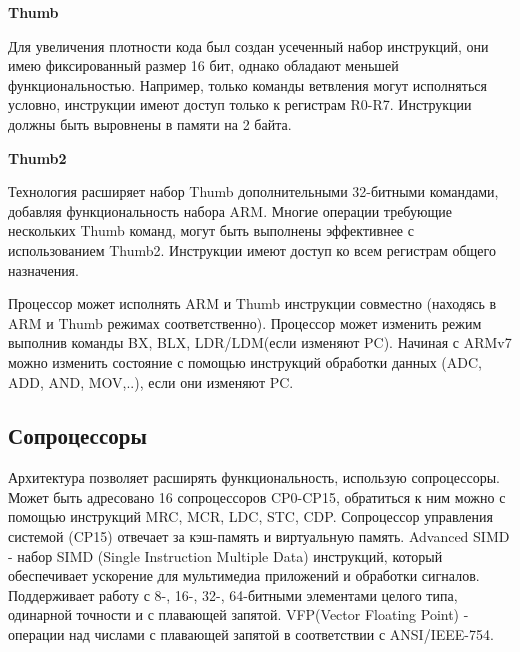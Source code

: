 \textbf{Thumb}

Для увеличения плотности кода был создан усеченный набор инструкций, они имею фиксированный размер 16 бит, однако обладают меньшей функциональностью. Например, только команды ветвления могут исполняться условно, инструкции имеют доступ только к регистрам R0-R7. Инструкции должны быть выровнены в памяти на 2 байта.

\textbf{Thumb2}

Технология расширяет набор Thumb дополнительными 32-битными командами, добавляя функциональность набора ARM. Многие операции требующие нескольких Thumb команд, могут быть выполнены эффективнее с использованием Thumb2. Инструкции имеют доступ ко всем регистрам общего назначения.

Процессор может исполнять ARM и Thumb инструкции совместно (находясь в ARM и Thumb режимах соответственно). Процессор может изменить режим выполнив команды BX, BLX, LDR/LDM(если изменяют PC). Начиная с ARMv7 можно изменить состояние с помощью инструкций обработки данных (ADC, ADD, AND, MOV,..), если они изменяют PC.

\subsection{Сопроцессоры}

Архитектура позволяет расширять функциональность, использую сопроцессоры. Может быть адресовано 16 сопроцессоров CP0-CP15, обратиться к ним можно с помощью инструкций MRC, MCR, LDC, STC, CDP. Сопроцессор управления системой (CP15) отвечает за кэш-память и виртуальную память.
Advanced SIMD - набор SIMD (Single Instruction Multiple Data) инструкций, который обеспечивает ускорение для мультимедиа приложений и обработки сигналов. Поддерживает работу с 8-, 16-, 32-, 64-битными элементами целого типа, одинарной точности и с плавающей запятой. VFP(Vector Floating Point) - операции над числами с плавающей запятой в соответствии с ANSI/IEEE-754.




